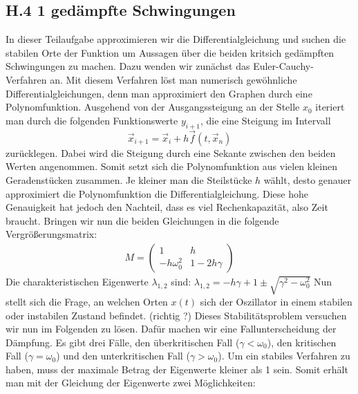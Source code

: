 \documentclass[ngerman]{scrartcl}
\begin{document}
\subsection{H.4 1 gedämpfte Schwingungen}
In dieser Teilaufgabe approximieren wir die Differentialgleichung und suchen die stabilen Orte der Funktion um Aussagen über die beiden kritsich gedämpften Schwingungen zu machen. Dazu wenden wir zunächst das Euler-Cauchy-Verfahren an. Mit diesem Verfahren löst man numerisch gewöhnliche Differentialgleichungen, denn man approximiert den Graphen durch eine Polynomfunktion. Ausgehend von der Ausgangssteigung an der Stelle $x_{0}$ iteriert man durch die folgenden Funktionswerte $y_{i+1}$, die eine Steigung im Intervall 
\begin{equation} \vec{x}_{i+1}=\vec{x}_{i}+h\vec{f}(t,\vec{x}_{n}) \end{equation} 
zurücklegen. Dabei wird die Steigung durch eine Sekante zwischen den beiden Werten angenommen. Somit setzt sich die Polynomfunktion aus vielen kleinen Geradenstücken zusammen. Je kleiner man die Steilstücke $h$ wählt, desto genauer approximiert die Polynomfunktion die Differentialgleichung. Diese hohe Genauigkeit hat jedoch den Nachteil, dass es viel Rechenkapazität, also Zeit braucht. \newline 
Bringen wir nun die beiden Gleichungen in die folgende Vergrößerungsmatrix:
\begin{align}
M=\left(\begin{array}{cc} 1 & h \\ -h\omega_{0}^{2} & 1-2h\gamma \end{array}\right)
\end{align}
Die charakteristischen Eigenwerte $\lambda_{1,2}$ sind: $\lambda_{1,2}=-h\gamma+1\pm\sqrt{\gamma^2-\omega^2_0}$
Nun stellt sich die Frage, an welchen Orten $x(t)$ sich der Oszillator in einem stabilen oder instabilen Zustand befindet. (richtig ?) Dieses Stabilitätsproblem versuchen wir nun im Folgenden zu lösen. Dafür machen wir eine Fallunterscheidung der Dämpfung. Es gibt drei Fälle, den überkritischen Fall ($\gamma < \omega_0$), den kritischen Fall ($\gamma = \omega_0$) und den unterkritischen Fall ($\gamma > \omega_0$). Um ein stabiles Verfahren zu haben, muss der maximale Betrag der Eigenwerte kleiner als 1 sein. Somit erhält man mit der Gleichung der Eigenwerte zwei Möglichkeiten: 
\end{document}
